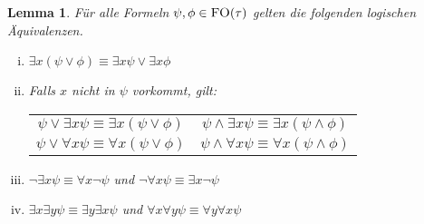 \documentclass[12pt,a4paper]{article}
\newtheorem{lem}[defi]{Lemma}
\begin{document}
	\begin{lem}
		Für alle Formeln $\psi,\phi\in\textsc{FO}(\tau)$ gelten die folgenden logischen Äquivalenzen.
		\begin{enumerate}[(i)]
			\item $\exists x(\psi\vee\phi)\equiv\exists x\psi\vee\exists x\phi$
			\item Falls $x$ nicht in $\psi$ vorkommt, gilt:\\
			\begin{tabular}{c c}
				$\psi\vee\exists x\psi\equiv\exists x(\psi\vee\phi)$ & 
				$\psi\wedge\exists x\psi\equiv\exists x(\psi\wedge\phi)$\\
				$\psi\vee\forall x\psi\equiv\forall x(\psi\vee\phi)$ & 
				$\psi\wedge\forall x\psi\equiv\forall x(\psi\wedge\phi)$
			\end{tabular}
		\item $\neg\exists x\psi\equiv\forall x\neg\psi$ und $\neg\forall x\psi\equiv\exists x\neg\psi$
		\item $\exists x\exists y\psi\equiv\exists y\exists x\psi$ und 
		$\forall x\forall y\psi\equiv\forall y\forall x\psi$
		\end{enumerate}
	\end{lem}
\end{document}
